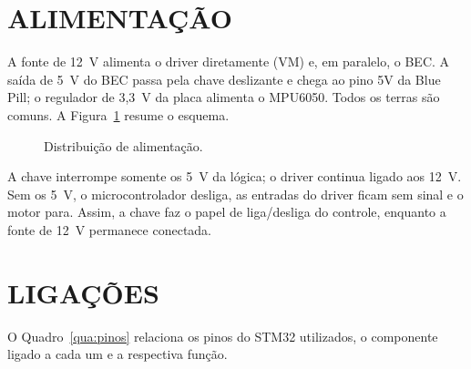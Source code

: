 \section{ALIMENTAÇÃO}

A fonte de 12~V alimenta o driver diretamente (VM) e, em paralelo, o BEC. A saída de 5~V do BEC passa pela chave deslizante e chega ao pino 5V da Blue Pill; o regulador de 3,3~V da placa alimenta o MPU6050. Todos os terras são comuns. A Figura~\ref{fig:alimentacao} resume o esquema.
\begin{figure}[H]
\centering\caption{Distribuição de alimentação.}\label{fig:alimentacao}
\end{figure}
A chave interrompe somente os 5~V da lógica; o driver continua ligado aos 12~V. Sem os 5~V, o microcontrolador desliga, as entradas do driver ficam sem sinal e o motor para. Assim, a chave faz o papel de liga/desliga do controle, enquanto a fonte de 12~V permanece conectada.

\section{LIGAÇÕES}

O Quadro~\ref{qua:pinos} relaciona os pinos do STM32 utilizados, o componente ligado a cada um e a respectiva função.

